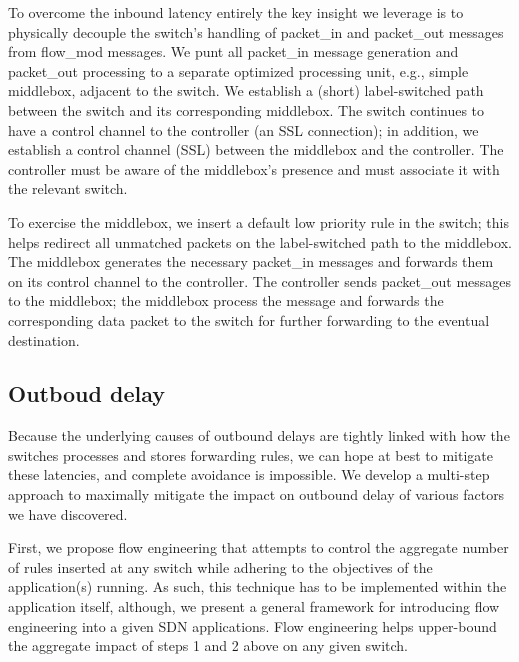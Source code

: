 \documentclass[onecolumn]{sig-alternate-10pt-onecolumn}
\begin{document}
To overcome the inbound latency entirely the key insight we leverage is to
physically decouple the switch's handling of packet\_in and packet\_out messages
from flow\_mod messages. We punt all packet\_in message generation and packet\_out
processing to a separate optimized processing unit, e.g., simple middlebox,
adjacent to the switch. We establish a (short) label-switched path between the
switch and its corresponding middlebox. The switch continues to have a control
channel to the controller (an SSL connection); in addition, we establish a
control channel (SSL) between the middlebox and the controller. The controller
must be aware of the middlebox's presence and must associate it with the
relevant switch. 

To exercise the middlebox, we insert a default low priority rule in the
switch; this helps redirect all unmatched packets on the label-switched path
to the middlebox. The middlebox generates the necessary
packet\_in messages and forwards them on its control channel to the
controller. The controller sends packet\_out messages to the middlebox; the
middlebox process the message and forwards the corresponding data packet to the
switch for further forwarding to the eventual destination. 

\subsection{Outboud delay}
Because
the underlying causes of outbound delays are tightly linked with how
the switches processes and stores forwarding rules, we can hope at
best to mitigate these latencies, and complete avoidance is
impossible. We develop a multi-step approach to maximally mitigate the impact on
outbound delay of various factors we have discovered.

First, we propose flow engineering that attempts to control the aggregate number
of rules inserted at any switch while adhering to the objectives of the
application(s) running. As such, this technique has to be implemented within the
application itself, although, we present a general framework for introducing
flow engineering into a given SDN applications. Flow engineering helps
upper-bound the aggregate impact of steps 1 and 2 above on any given switch. 
\end{document}
